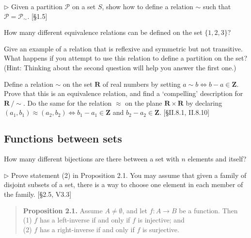 \begin{problem}
  $\rhd$ Given a partition $\mathscr{P}$ on a set $S$, show how to define a
  relation $\sim$ such that $\mathscr{P} = \mathscr{P}_{\sim}$. [\S1.5]
\end{problem}

\begin{problem}
  How many different equivalence relations can be defined on the set
  $\{1,2,3\}?$
\end{problem}

\begin{problem}
  Give an example of a relation that is reflexive and symmetric but not
  transitive. What happens if you attempt to use this relation to define a
  partition on the set? (Hint: Thinking about the second question will help
  you answer the first one.)
\end{problem}

\begin{problem}
  Define a relation $\sim$ on the set $\mathbf{R}$ of real numbers by
  setting $a\sim b\iff b-a\in\mathbf{Z}$. Prove that this is an equivalence
  relation, and find a `compelling' description for $\mathbf{R}\,/\!\sim$.
  Do the same for the relation $\approx$ on the plane $\mathbf{R}\times
  \mathbf{R}$ by declaring $(a_1,b_1)\approx(a_2,b_2)\iff
  b_1-a_1\in\mathbf{Z}$ and $b_2-a_2\in\mathbf{Z}$. [\S II.8.1, II.8.10]
\end{problem}

\subsection{Functions between sets}


\begin{problem}
  How many different bijections are there between a set with $n$ elements
  and itself?
\end{problem}

\begin{problem}
  $\rhd$ Prove statement (2) in Proposition 2.1. You may assume that given a
  family of disjoint subsets of a set, there is a way to choose one element
  in each member of the family. [\S2.5, V3.3]

  \begin{quote}
    \textbf{Proposition 2.1.} Assume $A\neq\emptyset$, and let $f:A\to B$ be
    a function. Then \\
      (1) $f$ has a left-inverse if and only if $f$ is injective; and \\
      (2) $f$ has a right-inverse if and only if $f$ is surjective.
  \end{quote}
\end{problem}

